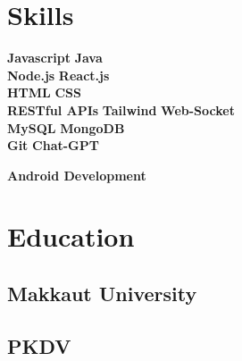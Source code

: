 \documentclass{deedy-resume-openfont}
\begin{document}
%
%
\lastupdated

%
%



%
%

\begin{minipage}[t]{0.33\textwidth} 



\section{Skills}


\textbullet{} \textbf{Javascript} \textbullet{} \textbf{Java} \\   
\textbullet{} \textbf{Node.js} \textbullet{} \textbf{React.js} \\
\textbullet{} \textbf{HTML} \textbullet{} \textbf{CSS}  \\
\textbullet{} \textbf{RESTful APIs} 
\textbullet{} \textbf{Tailwind} \textbullet{} \textbf{Web-Socket} \\
\textbullet{} \textbf{MySQL} \textbullet{} \textbf{MongoDB} \\
\textbullet{} \textbf{Git} \textbullet{} \textbf{Chat-GPT} 

 \textbullet{} \textbf{Android Development}
\sectionsep


\section{Education} 

\subsection{Makkaut University}

\sectionsep

\subsection{PKDV}


\end{minipage}
\end{document}
